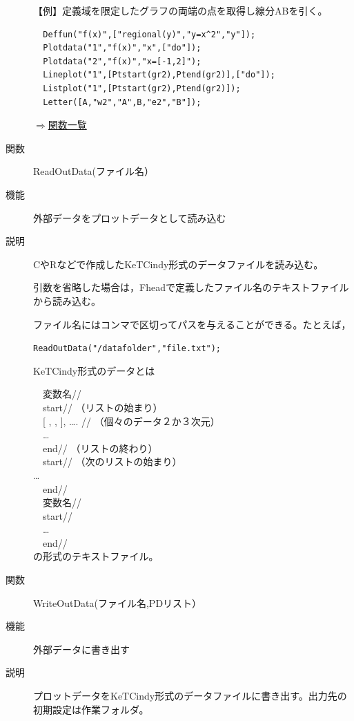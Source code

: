 \documentclass[papersize,a4paper,12pt,uplatex]{jsarticle}
\begin{document}
\begin{description}
\vspace{\baselineskip}
【例】定義域を限定したグラフの両端の点を取得し線分ABを引く。
\begin{verbatim}
  Deffun("f(x)",["regional(y)","y=x^2","y"]); 
  Plotdata("1","f(x)","x",["do"]);
  Plotdata("2","f(x)","x=[-1,2]");
  Lineplot("1",[Ptstart(gr2),Ptend(gr2)],["do"]);
  Listplot("1",[Ptstart(gr2),Ptend(gr2)]);
  Letter([A,"w2","A",B,"e2","B"]);
\end{verbatim}
\vspace{\baselineskip}
\begin{center}  \end{center}

\begin{flushright}  \hyperlink{functionlist}{$\Rightarrow$関数一覧}\end{flushright}
\vspace{\baselineskip}
\hypertarget{readoutdata}{}
\item[関数]  ReadOutData(ファイル名）
\item[機能]  外部データをプロットデータとして読み込む
\item[説明]  CやRなどで作成したKeTCindy形式のデータファイルを読み込む。

引数を省略した場合は，Fheadで定義したファイル名のテキストファイルから読み込む。

ファイル名にはコンマで区切ってパスを与えることができる。たとえば，

\verb|ReadOutData("/datafolder","file.txt"); |
      
KeTCindy形式のデータとは

　変数名// \\
　start//  （リストの始まり） \\
　[ , , ], …. // （個々のデータ２か３次元） \\
　… \\
　end// （リストの終わり） \\
　start// （次のリストの始まり） \\
    … \\
　end// \\
　変数名// \\
　start// \\
　… \\
　end// \\

の形式のテキストファイル。

\vspace{\baselineskip}
\hypertarget{writeoutdata}{}
\item[関数]  WriteOutData(ファイル名,PDリスト）
\item[機能]  外部データに書き出す
\item[説明]  プロットデータをKeTCindy形式のデータファイルに書き出す。出力先の 初期設定は作業フォルダ。


\end{description}
\end{document}
